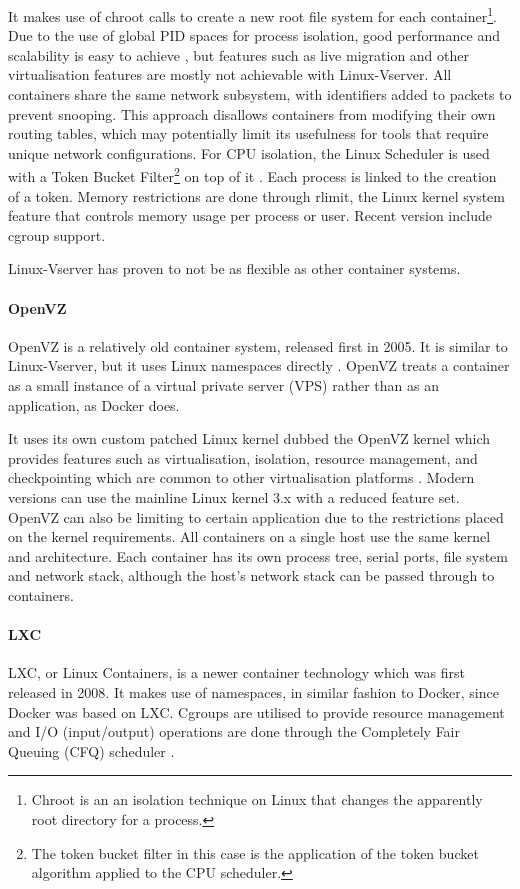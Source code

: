 It makes use of chroot calls to create a new root file system for each container\footnote{Chroot is an an isolation technique on Linux that changes the apparently root directory for a process.}. Due to the use of global PID spaces for process isolation, good performance and scalability is easy to achieve , but features such as live migration and other virtualisation features are mostly not achievable with Linux-Vserver. All containers share the same network subsystem, with identifiers added to packets to prevent snooping. This approach disallows containers from modifying their own routing tables, which may potentially limit its usefulness for tools that require unique network configurations. For CPU isolation, the Linux Scheduler is used with a Token Bucket Filter\footnote{The token bucket filter in this case is the application of the token bucket algorithm applied to the CPU scheduler.} on top of it \parencite{soltesz2007container}. Each process is linked to the creation of a token. Memory restrictions are done through rlimit, the Linux kernel system feature that controls memory usage per process or user. Recent version include cgroup support.

Linux-Vserver has proven to not be as flexible as other container systems.

\paragraph{OpenVZ}
OpenVZ is a relatively old container system, released first in 2005. It is similar to Linux-Vserver, but it uses Linux namespaces directly \parencite{dua2014virtualization}. OpenVZ treats a container as a small instance of a virtual private server (VPS) rather than as an application, as Docker does.

It uses its own custom patched Linux kernel dubbed the OpenVZ kernel which provides features such as virtualisation, isolation, resource management, and checkpointing which are common to other virtualisation platforms \parencite{kolyshkin2006virtualization,che2010synthetical}. Modern versions can use the mainline Linux kernel 3.x with a reduced feature set. OpenVZ can also be limiting to certain application due to the restrictions placed on the kernel requirements. All containers on a single host use the same kernel and architecture. Each container has its own process tree, serial ports, file system and network stack, although the host's network stack can be passed through to containers.

\paragraph{LXC}
LXC, or Linux Containers, is a newer container technology which was first released in 2008. It makes use of namespaces, in similar fashion to Docker, since Docker was based on LXC. Cgroups are utilised to provide resource management and I/O (input/output) operations are done through the Completely Fair Queuing (CFQ) scheduler \parencite{rizki2016performance}.

